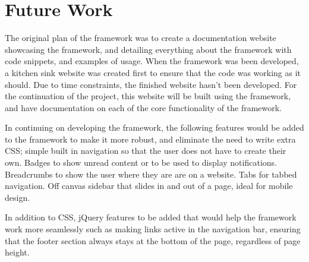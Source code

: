 \newpage
\chapter*{Future Work}



The original plan of the framework was to create a documentation website showcasing the framework, and detailing everything about the framework with code snippets, and examples of usage. When the framework was been developed, a kitchen sink website was created first to ensure that the code was working as it should. Due to time constraints, the finished website hasn't been developed. For the continuation of the project, this website will be built using the framework, and have documentation on each of the core functionality of the framework. 

In continuing on developing the framework, the following features would be added to the framework to make it more robust, and eliminate the need to write extra CSS; simple built in navigation so that the user does not have to create their own. Badges to show unread content or to be used to display notifications. Breadcrumbs to show the user where they are are on a website. Tabs for tabbed navigation. Off canvas sidebar that slides in and out of a page, ideal for mobile design. 

In addition to CSS, jQuery features to be added that would help the framework work more seamlessly such as making links active in the navigation bar, ensuring that the footer section always stays at the bottom of the page, regardless of page height. 

%
%

